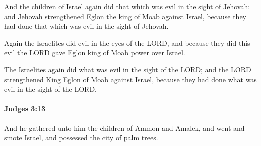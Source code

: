 			\begin{versebox}
					\item[BHS] 
					\item[ASV] And the children of Israel again did that which was evil in the sight of Jehovah: and Jehovah strengthened Eglon the king of Moab against Israel, because they had done that which was evil in the sight of Jehovah.
					\item[NIV] Again the Israelites did evil in the eyes of the LORD, and because they did this evil the LORD gave Eglon king of Moab power over Israel.
					\item[NRSV] The Israelites again did what was evil in the sight of the LORD; and the LORD strengthened King Eglon of Moab against Israel, because they had done what was evil in the sight of the LORD.
			\end{versebox}

		\paragraph{Judges 3:13} %
			\label{JUDGES-3-13}

			And he gathered unto him the children of Ammon and Amalek, and went and smote Israel, and possessed the city of palm trees.

